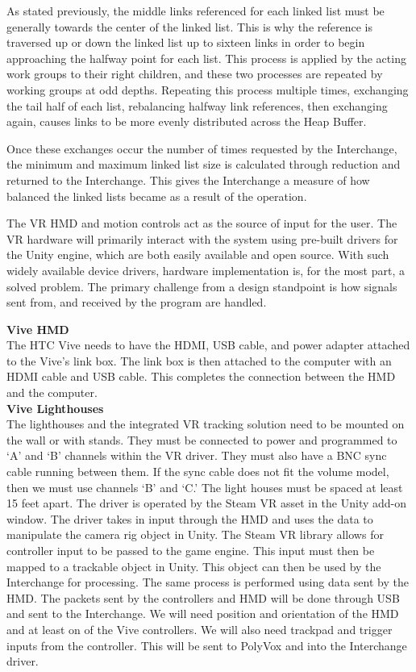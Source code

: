 \documentclass[onecolumn, draftclsnofoot,10pt, compsoc]{IEEEtran}
\newcounter{threesection}[subsubsection]
\newcounter{foursection}[threesection]
\begin{document}
As stated previously, the middle links referenced for each linked list must be generally towards the center of the linked list.
This is why the reference is traversed up or down the linked list up to sixteen links in order to begin approaching the halfway point for each list.
This process is applied by the acting work groups to their right children, and these two processes are repeated by working groups at odd depths.
Repeating this process multiple times, exchanging the tail half of each list, rebalancing halfway link references, then exchanging again, causes links to be more evenly distributed across the Heap Buffer.

Once these exchanges occur the number of times requested by the Interchange, the minimum and maximum linked list size is calculated through reduction and returned to the Interchange.
This gives the Interchange a measure of how balanced the linked lists became as a result of the operation.

The VR HMD and motion controls act as the source of input for the user.
The VR hardware will primarily interact with the system using pre-built drivers for the Unity engine, which are both easily available and open source.
With such widely available device drivers, hardware implementation is, for the most part, a solved problem.
The primary challenge from a design standpoint is how signals sent from, and received by the program are handled.

\textbf{Vive HMD} \\
The HTC Vive needs to have the HDMI, USB cable, and power adapter attached to the Vive's link box. The link box is then attached to the computer with an HDMI cable and USB cable. This completes the connection between the HMD and the computer.\\
\textbf{Vive Lighthouses} \\
The lighthouses and the integrated VR tracking solution need to be mounted on the wall or with stands. They must be connected to power and programmed to ‘A’ and ‘B’ channels within the VR driver. They must also have a BNC sync cable running between them. If the sync cable does not fit the volume model, then we must use channels ‘B’ and ‘C.’ The light houses must be spaced at least 15 feet apart. 
The driver is operated by the Steam VR asset in the Unity add-on window. The driver takes in input through the HMD and uses the data to manipulate the camera rig object in Unity. The Steam VR library allows for controller input to be passed to the game engine. This input must then be mapped to a trackable object in Unity. This object can then be used by the Interchange for processing. The same process is performed using data sent by the HMD. The packets sent by the controllers and HMD will be done through USB and sent to the Interchange. We will need position and orientation of the HMD and at least on of the Vive controllers. We will also need trackpad and trigger inputs from the controller. This will be sent to PolyVox and into the Interchange driver.
\end{document}

